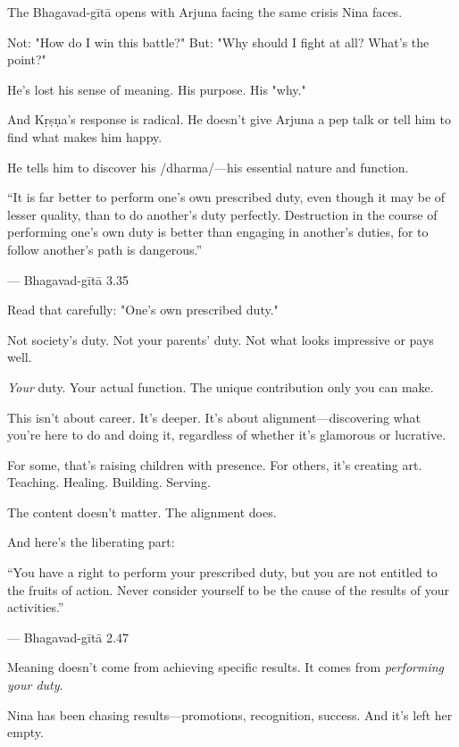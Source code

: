 \documentclass[11pt,twoside]{book}
\begin{document}
The Bhagavad-gītā opens with Arjuna facing the same crisis Nina faces.

Not: "How do I win this battle?" But: "Why should I fight at all? What's the point?"

He's lost his sense of meaning. His purpose. His "why."

And Kṛṣṇa's response is radical. He doesn't give Arjuna a pep talk or tell him to find what makes him happy.

He tells him to discover his /dharma/—his essential nature and function.

\begin{pullquote}
``It is far better to perform one's own prescribed duty, even though it may be of lesser quality, than to do another's duty perfectly. Destruction in the course of performing one's own duty is better than engaging in another's duties, for to follow another's path is dangerous.''

--- Bhagavad-gītā 3.35
\end{pullquote}

Read that carefully: "One's own prescribed duty."

Not society's duty. Not your parents' duty. Not what looks impressive or pays well.

\emph{Your} duty. Your actual function. The unique contribution only you can make.

This isn't about career. It's deeper. It's about alignment—discovering what you're here to do and doing it, regardless of whether it's glamorous or lucrative.

For some, that's raising children with presence. For others, it's creating art. Teaching. Healing. Building. Serving.

The content doesn't matter. The alignment does.

And here's the liberating part:

\begin{pullquote}
``You have a right to perform your prescribed duty, but you are not entitled to the fruits of action. Never consider yourself to be the cause of the results of your activities.''

--- Bhagavad-gītā 2.47
\end{pullquote}

Meaning doesn't come from achieving specific results. It comes from \emph{performing your duty}.

Nina has been chasing results—promotions, recognition, success. And it's left her empty.
\end{document}
